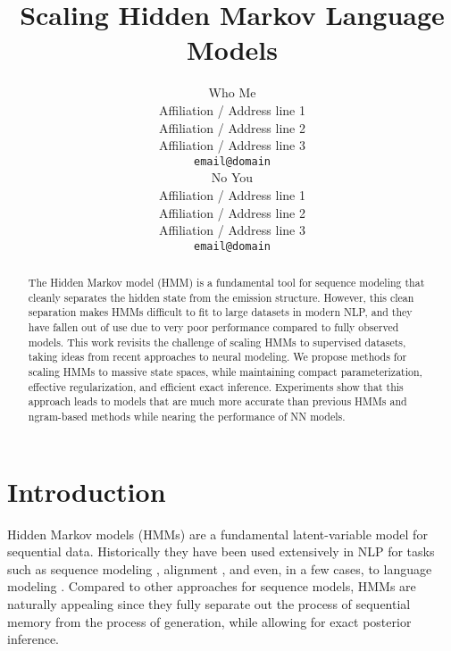 \documentclass[11pt,a4paper]{article}
\title{Scaling Hidden Markov Language Models}
\author{Who Me \\
  Affiliation / Address line 1 \\
  Affiliation / Address line 2 \\
  Affiliation / Address line 3 \\
  \texttt{email@domain} \\\And
  No You \\
  Affiliation / Address line 1 \\
  Affiliation / Address line 2 \\
  Affiliation / Address line 3 \\
  \texttt{email@domain} \\}
\date{}
\begin{document}
\maketitle
\begin{abstract}
The Hidden Markov model (HMM) is a fundamental tool for sequence modeling that 
cleanly separates the hidden state from the emission structure.
However, this clean separation makes HMMs difficult to fit to large datasets in modern NLP, 
and they have fallen out of use due to very poor performance 
compared to fully observed models. This work revisits the challenge of 
scaling HMMs to supervised datasets, taking ideas from recent approaches to neural modeling.
We propose methods for scaling HMMs to massive state spaces, while maintaining compact parameterization, effective regularization, and efficient exact inference. Experiments show that this approach leads to models that are much more accurate than previous HMMs and ngram-based methods while nearing the performance of  NN models. 
\end{abstract}

\section{Introduction}


Hidden Markov models (HMMs) are a fundamental latent-variable model for sequential data.
Historically they have been used extensively in NLP for tasks such as
sequence modeling \citep{rabiner1990tut}, alignment \citep{vogel1996hmm},
and even, in a few cases, to language modeling \citep{kuhn1994hmmlm,huang2011thesis}. 
Compared to other approaches for sequence models, HMMs are naturally appealing since they 
fully separate out the process of sequential memory from the process of generation, while allowing for 
exact posterior inference. 


\end{document}
